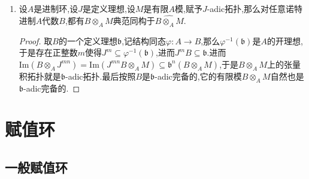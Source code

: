 \begin{enumerate}
\begin{proof}
		因为$\mathfrak{d}^{2n}\subseteq\mathrm{Im}(\mathfrak{b}^n\otimes_AC)+\mathrm{Im}(B\otimes_A\mathfrak{c}^n)$.从$\mathfrak{b}^n$和$\mathfrak{c}^n$趋于0得到$\mathfrak{d}^n$趋于0.
	\end{proof}
    \item 设$A$是进制环,设$J$是定义理想,设$M$是有限$A$模,赋予$J$-adic拓扑,那么对任意诺特进制$A$代数$B$,都有$B\otimes_AM$典范同构于$\widehat{B\otimes_AM}$.
    \begin{proof}
    	
    	取$B$的一个定义理想$\mathfrak{b}$,记结构同态$\varphi:A\to B$,那么$\varphi^{-1}(\mathfrak{b})$是$A$的开理想,于是存在正整数$m$使得$J^m\subseteq\varphi^{-1}(\mathfrak{b})$,进而$J^mB\subseteq\mathfrak{b}$.进而$\mathrm{Im}(B\otimes_AJ^{mn})=\mathrm{Im}(J^{mn}B\otimes_AM)\subseteq\mathfrak{b}^n(B\otimes_AM)$,于是$B\otimes_AM$上的张量积拓扑就是$\mathfrak{b}$-adic拓扑.最后按照$B$是$\mathfrak{b}$-adic完备的,它的有限模$B\otimes_AM$自然也是$\mathfrak{b}$-adic完备的.
    \end{proof}
\end{enumerate}
\newpage
\section{赋值环}
\subsection{一般赋值环}

